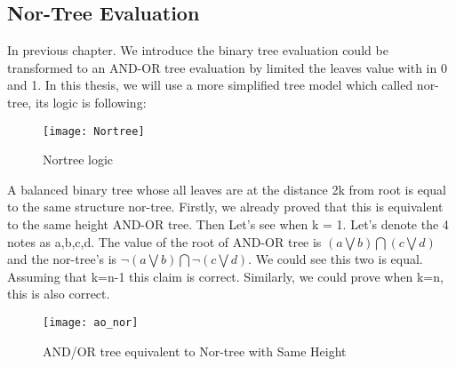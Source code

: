 \subsection{Nor-Tree Evaluation}
In previous chapter. We introduce the binary tree evaluation could be transformed to an AND-OR tree evaluation by limited the leaves value with in 0 and 1. In this thesis, we will use a more simplified tree model which called nor-tree, its logic is following:
\begin{figure}[H]
	\centering
	\texttt{[image: Nortree]}
	\caption{Nortree logic}
	\label{fig:nortree}
\end{figure}
A balanced binary tree whose all leaves are at the distance 2k from root is equal to the same structure nor-tree. Firstly, we already proved that this is equivalent to the same height AND-OR tree. Then Let's see when k = 1. Let's denote the 4 notes as a,b,c,d. The value of the root of AND-OR tree is $(a \bigvee b) \bigcap(c \bigvee d)$ and the nor-tree's is $\neg(a \bigvee b) \bigcap \neg (c \bigvee d)$. We could see this two is equal. Assuming that k=n-1 this claim is correct. Similarly, we could prove when k=n, this is also correct.
\begin{figure}[H]
	\centering
	\texttt{[image: ao\_nor]}
	\caption{AND/OR tree equivalent to Nor-tree with Same Height }
	\label{fig:aonor}
\end{figure}

